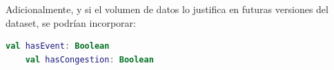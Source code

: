 Adicionalmente, y si el volumen de datos lo justifica en futuras versiones del dataset, se podrían incorporar:

\begin{lstlisting}[language=Kotlin, caption={Variables opcionales}]
	val hasEvent: Boolean
	val hasCongestion: Boolean
\end{lstlisting}

